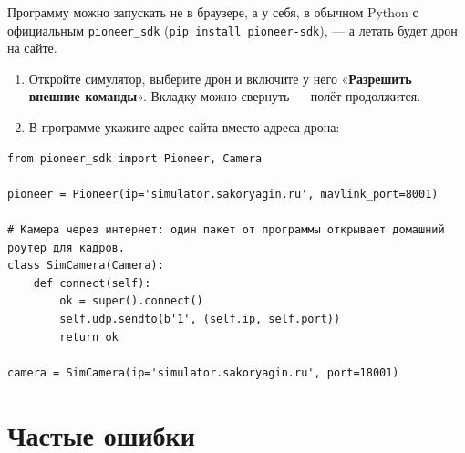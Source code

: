 \documentclass[11pt,a4paper]{article}
\newcommand{\ui}[1]{«\textbf{#1}»}
\begin{document}
Программу можно запускать не в браузере, а у себя, в обычном Python с официальным
\texttt{pioneer\_sdk} (\texttt{pip install pioneer-sdk}), — а летать будет дрон на сайте.

\begin{enumerate}[itemsep=1pt]
    \item Откройте симулятор, выберите дрон и включите у него \ui{Разрешить внешние команды}.
          Вкладку можно свернуть — полёт продолжится.
    \item В программе укажите адрес сайта вместо адреса дрона:
\end{enumerate}
\begin{lstlisting}[style=py]
from pioneer_sdk import Pioneer, Camera

pioneer = Pioneer(ip='simulator.sakoryagin.ru', mavlink_port=8001)

# Камера через интернет: один пакет от программы открывает домашний роутер для кадров.
class SimCamera(Camera):
    def connect(self):
        ok = super().connect()
        self.udp.sendto(b'1', (self.ip, self.port))
        return ok

camera = SimCamera(ip='simulator.sakoryagin.ru', port=18001)
\end{lstlisting}

\section{Частые ошибки}
\end{document}
